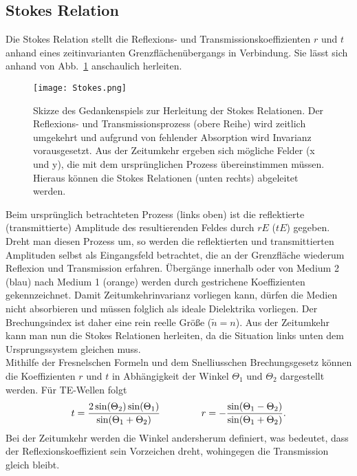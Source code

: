 \subsection{\label{subsec:FZV4}Stokes Relation}
Die Stokes Relation stellt die Reflexions- und Transmissionskoeffizienten $r$ und $t$ anhand 
eines zeitinvarianten Grenzflächenübergangs in Verbindung. Sie lässt sich anhand von Abb.~\ref{fig:stokes} 
anschaulich herleiten.
\begin{figure}[h!]
    \centering
    \texttt{[image: Stokes.png]}
    \caption{\label{fig:stokes}Skizze des Gedankenspiels zur Herleitung der Stokes Relationen.
    Der Reflexions- und Transmissionsprozess (obere Reihe) wird zeitlich umgekehrt und aufgrund von 
    fehlender Absorption wird Invarianz vorausgesetzt. Aus der Zeitumkehr ergeben sich mögliche 
    Felder (x und y), die mit dem ursprünglichen Prozess übereinstimmen müssen. Hieraus können die 
    Stokes Relationen (unten rechts) abgeleitet werden.}
\end{figure}\FloatBarrier
Beim ursprünglich betrachteten Prozess (links oben) ist die reflektierte (transmittierte) Amplitude 
des resultierenden Feldes durch $rE$ ($tE$) gegeben. Dreht man diesen Prozess um, so werden die 
reflektierten und transmittierten Amplituden selbst als Eingangsfeld betrachtet, die an der 
Grenzfläche wiederum Reflexion und Transmission erfahren. Übergänge innerhalb oder von Medium 2 (blau) 
nach Medium 1 (orange) werden durch gestrichene Koeffizienten gekennzeichnet. Damit Zeitumkehrinvarianz 
vorliegen kann, dürfen die Medien nicht absorbieren und müssen folglich als ideale Dielektrika vorliegen. 
Der Brechungsindex ist daher eine rein reelle Größe ($\tilde{n} = n$). 
Aus der Zeitumkehr kann man nun die Stokes Relationen herleiten, da die Situation links unten dem Ursprungssystem gleichen muss. \\
Mithilfe der Fresnelschen Formeln und dem Snelliusschen Brechungsgesetz können die Koeffizienten $r$ und $t$ in Abhängigkeit 
der Winkel $\Theta_{1}$ und $\Theta_{2}$ dargestellt werden. Für TE-Wellen folgt
\begin{equation}
    t = \frac{2\sin(\Theta_{2})\sin(\Theta_{1})}{\sin(\Theta_{1} + \Theta_{2})} 
    \hspace{1.5cm}
    r = -\frac{\sin(\Theta_{1} - \Theta_{2})}{\sin(\Theta_{1} + \Theta_{2})}.
\end{equation}
Bei der Zeitumkehr werden die Winkel andersherum definiert, was bedeutet, dass der Reflexionskoeffizient sein Vorzeichen dreht, 
wohingegen die Transmission gleich bleibt. 
